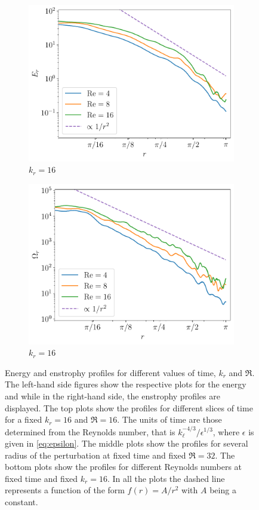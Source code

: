\documentclass[../main.tex]{subfiles}
\begin{document}
\begin{figure}[!ht]
	\begin{subfigure}{0.44\textwidth}
		\centering
		\includegraphics[width=\textwidth]{images/Energy_Re.kdn16.175.pdf}
		\caption{$k_r = 16$}
	\end{subfigure}\hspace{0.04\textwidth}
	\begin{subfigure}{0.44\textwidth}
		\centering
		\includegraphics[width=\textwidth]{images/Enstrophy_Re.kdn16.175.pdf}
		\caption{$k_r = 16$}
	\end{subfigure}
	\caption{Energy and enstrophy profiles for different values of time, $k_r$ and $\Re$. The left-hand side figures show the respective plots for the energy and while in the right-hand side, the enstrophy profiles are displayed. The top plots show the profiles for different slices of time for a fixed $k_r=16$ and $\Re=16$. The units of time are those determined from the Reynolds number, that is $k_\ell^{-4/3}/\epsilon^{1/3}$, where $\epsilon$ is given in \cref{eq:epsilon}. The middle plots show the profiles for several radius of the perturbation at fixed time and fixed $\Re=32$. The bottom plots show the profiles for different Reynolds numbers at fixed time and fixed $k_r=16$. In all the plots the dashed line represents a function of the form $f(r)=A/r^2$ with $A$ being a constant.}\label{fig:energy_enstrophy}
\end{figure}
\end{document}

